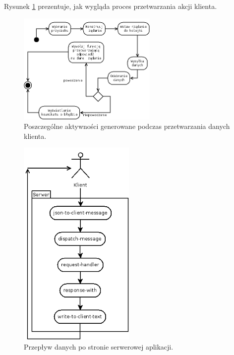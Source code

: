 Rysunek \ref{fig:clientflow} prezentuje, jak wygląda proces przetwarzania akcji klienta.
\clearpage
\begin{figure}[h]
    \centering
    \includegraphics[width=0.6\textwidth]{imgs/clientflow.png}
    \caption{Poszczególne aktywności generowane podczas przetwarzania danych klienta.}
    \label{fig:clientflow}
\end{figure}

\begin{figure}[h]
    \centering
    \includegraphics[width=0.5\textwidth]{imgs/serverflow.png}
    \caption{Przepływ danych po stronie serwerowej aplikacji.}
    \label{fig:serverflow}
\end{figure}

